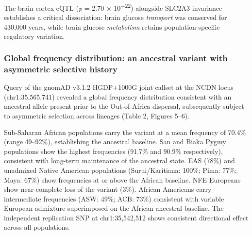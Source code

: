 \documentclass[
  letterpaper,
  DIV=11,
  numbers=noendperiod]{scrartcl}
\begin{document}
The brain cortex eQTL (\emph{p} = 2.70 × 10\textsuperscript{−22})
alongside SLC2A3 invariance establishes a critical dissociation: brain
glucose \emph{transport} was conserved for 430,000 years, while brain
glucose \emph{metabolism} retains population-specific regulatory
variation.

\subsubsection{Global frequency distribution: an ancestral variant with
asymmetric selective
history}\label{global-frequency-distribution-an-ancestral-variant-with-asymmetric-selective-history}

Query of the gnomAD v3.1.2 HGDP+1000G joint callset at the NCDN locus
(chr1:35,565,741) revealed a global frequency distribution consistent
with an ancestral allele present prior to the Out-of-Africa dispersal,
subsequently subject to asymmetric selection across lineages (Table 2,
Figures 5--6).

Sub-Saharan African populations carry the variant at a mean frequency of
70.4\% (range 49--92\%), establishing the ancestral baseline. San and
Biaka Pygmy populations show the highest frequencies (91.7\% and 90.9\%
respectively), consistent with long-term maintenance of the ancestral
state. EAS (78\%) and unadmixed Native American populations
(Surui/Karitiana: 100\%; Pima: 77\%; Maya: 67\%) show frequencies at or
above the African baseline. NFE Europeans show near-complete loss of the
variant (3\%). African Americans carry intermediate frequencies (ASW:
49\%; ACB: 73\%) consistent with variable European admixture
superimposed on the African ancestral baseline. The independent
replication SNP at chr1:35,542,512 shows consistent directional effect
across all populations.
\end{document}
